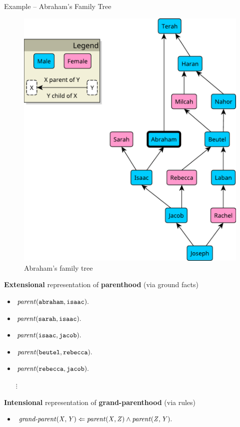 \documentclass[presentation]{beamer}\mode<presentation>{\usetheme{AMSBolognaFC}}
\begin{document}
\begin{frame}[allowframebreaks]{Example -- Abraham's Family Tree}
    \begin{figure}
        \centering
        \caption{Abraham's family tree }
        \includegraphics[width=.4\linewidth]{figures/family-tree.pdf}
    \end{figure}

    \framebreak

    \begin{block}{\textbf{Extensional} representation of \textbf{parenthood} (via ground facts)}
        \begin{itemize}
            \item $\text{\textit{parent}}(\mathtt{abraham}, \mathtt{isaac})\mathtt{.}$
            \item $\text{\textit{parent}}(\mathtt{sarah}, \mathtt{isaac})\mathtt{.}$
            \item $\text{\textit{parent}}(\mathtt{isaac}, \mathtt{jacob})\mathtt{.}$
            \item $\text{\textit{parent}}(\mathtt{beutel}, \mathtt{rebecca})\mathtt{.}$
            \item $\text{\textit{parent}}(\mathtt{rebecca}, \mathtt{jacob})\mathtt{.}$
            \item[$\vdots$]
        \end{itemize}
    \end{block}

    \framebreak

    \begin{block}{\textbf{Intensional} representation of \textbf{grand-parenthood} (via rules)}
        \begin{itemize}
            \item $\text{\textit{grand\text{-}parent}}(\mathit{X}, \mathit{Y}) \Leftarrow \text{\textit{parent}}(\mathit{X}, \mathit{Z}) \wedge \text{\textit{parent}}(\mathit{Z}, \mathit{Y}) \mathtt{.}$
        \end{itemize}
    \end{block}


\end{frame}
\end{document}
